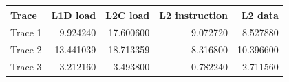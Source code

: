 \begin{tabular}{lrrrr}
\toprule
Trace & L1D load & L2C load & L2 instruction & L2 data \\
\midrule
Trace 1 & 9.924240 & 17.600600 & 9.072720 & 8.527880 \\
Trace 2 & 13.441039 & 18.713359 & 8.316800 & 10.396600 \\
Trace 3 & 3.212160 & 3.493800 & 0.782240 & 2.711560 \\
\bottomrule
\end{tabular}
